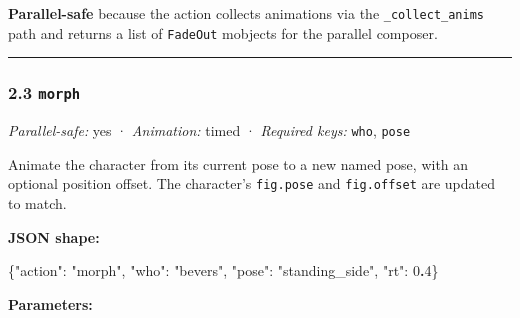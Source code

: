 \documentclass[
  11pt,
]{book}
\newenvironment{Shaded}{}{}
\newcommand{\DataTypeTok}[1]{\textcolor[rgb]{0.56,0.13,0.00}{#1}}
\newcommand{\DecValTok}[1]{\textcolor[rgb]{0.25,0.63,0.44}{#1}}
\newcommand{\ErrorTok}[1]{\textcolor[rgb]{1.00,0.00,0.00}{\textbf{#1}}}
\newcommand{\FunctionTok}[1]{\textcolor[rgb]{0.02,0.16,0.49}{#1}}
\newcommand{\StringTok}[1]{\textcolor[rgb]{0.25,0.44,0.63}{#1}}
\begin{document}
\textbf{Parallel-safe} because the action collects animations via the
\texttt{\_collect\_anims} path and returns a list of \texttt{FadeOut}
mobjects for the parallel composer.

\begin{center}\rule{0.5\linewidth}{0.5pt}\end{center}

\subsubsection{\texorpdfstring{2.3
\texttt{morph}}{2.3 morph}}\label{morph}

\emph{Parallel-safe:} yes · \emph{Animation:} timed · \emph{Required
keys:} \texttt{who}, \texttt{pose}

Animate the character from its current pose to a new named pose, with an
optional position offset. The character's \texttt{fig.pose} and
\texttt{fig.offset} are updated to match.

\textbf{JSON shape:}

\begin{Shaded}
\begin{Highlighting}[]
\FunctionTok{\{}\DataTypeTok{"action"}\FunctionTok{:} \StringTok{"morph"}\FunctionTok{,} \DataTypeTok{"who"}\FunctionTok{:} \StringTok{"bevers"}\FunctionTok{,} \DataTypeTok{"pose"}\FunctionTok{:} \StringTok{"standing\_side"}\FunctionTok{,} \DataTypeTok{"rt"}\FunctionTok{:} \DecValTok{0}\ErrorTok{.}\DecValTok{4}\FunctionTok{\}}
\end{Highlighting}
\end{Shaded}

\textbf{Parameters:}
\end{document}
